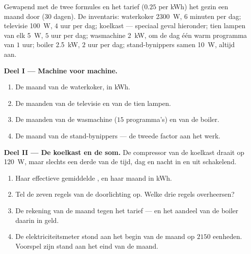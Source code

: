 \begin{problem}\label{pb:g9:electric-power-energy:1}
Gewapend met de twee formules en het tarief ($0.25$ per \unit{kWh})
 het gezin een maand door (30 dagen). De inventaris: waterkoker
\qty{2300}{W}, $6$ minuten per dag; televisie \qty{100}{W}, $4$
uur per dag; koelkast --- speciaal geval hieronder; tien lampen
van elk \qty{5}{W}, $5$ uur per dag; wasmachine \qty{2}{kW}, om
de dag één warm programma van $1$ uur; boiler \qty{2.5}{kW}, $2$
uur per dag; stand-bynippers samen \qty{10}{W}, altijd aan.

\medskip\noindent\textbf{Deel I --- Machine voor machine.}
\begin{enumerate}
  \item De maand van de waterkoker, in \unit{kWh}.
  \item De maanden van de televisie en van de tien lampen.
  \item De maanden van de wasmachine ($15$ programma's) en van de
        boiler.
  \item De maand van de stand-bynippers --- de tweede factor aan het
        werk.
\end{enumerate}

\medskip\noindent\textbf{Deel II --- De koelkast en de som.}
De compressor van de koelkast draait op \qty{120}{W}, maar slechts een
derde van de tijd, dag en nacht in en uit schakelend.
\begin{enumerate}[resume]
  \item Haar effectieve gemiddelde , en haar maand in
        \unit{kWh}.
  \item Tel de zeven regels van de doorlichting op. Welke drie regels
        overheersen?
  \item De rekening van de maand tegen het tarief --- en het aandeel
        van de boiler daarin in geld.
  \item De elektriciteitsmeter stond aan het begin van de maand op $2150$
        eenheden. Voorspel zijn stand aan het eind van de maand.
\end{enumerate}


\end{problem}
